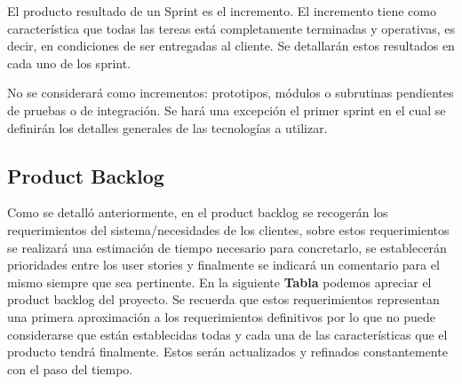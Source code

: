 El producto resultado de un Sprint es el incremento. El incremento tiene como característica que todas las tereas está completamente terminadas y operativas, es decir, en condiciones de ser  entregadas  al cliente. Se detallarán estos resultados en cada uno de los sprint.

No se considerará como incrementos: prototipos, módulos o subrutinas pendientes de pruebas o de integración. Se hará una excepción el primer sprint en el cual se definirán los detalles generales de las tecnologías a utilizar.

\subsection{Product Backlog}

Como se detalló anteriormente, en el product backlog  se recogerán los requerimientos del sistema/necesidades de los clientes, sobre estos requerimientos se realizará una estimación de tiempo necesario para concretarlo, se establecerán prioridades entre los user stories y finalmente se indicará un comentario para el mismo siempre que sea pertinente. 
En la siguiente \textbf{Tabla} podemos apreciar el product backlog del proyecto.
Se recuerda que estos requerimientos representan una primera aproximación a los requerimientos definitivos por lo que no puede considerarse que están establecidas todas y cada una de las características que el producto tendrá finalmente. Estos serán actualizados y refinados constantemente con el paso del tiempo.


